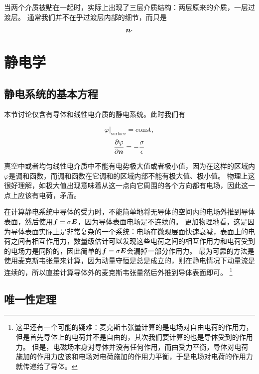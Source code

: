 \documentclass[UTF8, a4paper]{ctexart}
\newcommand*{\const}{\mathrm{const}}
\begin{document}
当两个介质被贴在一起时，实际上出现了三层介质结构：两层原来的介质，一层过渡层。
通常我们并不在乎过渡层内部的细节，而只是

\begin{equation}
    \vb*{n} \cdot 
\end{equation}

\section{静电学}

\subsection{静电系统的基本方程}

本节讨论仅含有导体和线性电介质的静电系统。此时我们有

\begin{equation}
    \varphi|_\text{surface} = \const,
\end{equation}
\begin{equation}
    \pdv{\varphi}{\vb*{n}} = - \frac{\sigma}{\epsilon}
\end{equation}

真空中或者均匀线性电介质中不能有电势极大值或者极小值，因为在这样的区域内$\varphi$是调和函数，而调和函数在它调和的区域内部不能有极大值、极小值。
物理上这很好理解，如极大值出现意味着从这一点向它周围的各个方向都有电场，因此这一点上应该有电荷，矛盾。

在计算静电系统中导体的受力时，不能简单地将无导体的空间内的电场外推到导体表面，然后使用$\vb*{f}=\sigma\vb*{E}$，因为导体表面电场是不连续的。
更加物理地看，这是因为导体表面实际上是非常复杂的一个系统：电场在微观层面快速衰减，表面上的电荷之间有相互作用力，数量级估计可以发现这些电荷之间的相互作用力和电荷受到的电场力是同阶的，因此简单的$\vb*{f}=\sigma\vb*{E}$会漏掉一部分作用力。
最为可靠的方法是使用麦克斯韦张量来计算，因为动量守恒是总是成立的，则在静电情况下动量流是连续的，所以直接计算导体外的麦克斯韦张量然后外推到导体表面即可。%
\footnote{
    这里还有一个可能的疑难：麦克斯韦张量计算的是电场对自由电荷的作用力，但是首先导体上的电荷并不是自由的，其次我们要计算的也是导体受到的作用力。
    但是，电磁场本身对导体并没有任何作用，而由受力平衡，导体对电荷施加的作用力应该和电场对电荷施加的作用力平衡，于是电场对电荷的作用力就传递给了导体。
}%

\subsection{唯一性定理}
\end{document}
